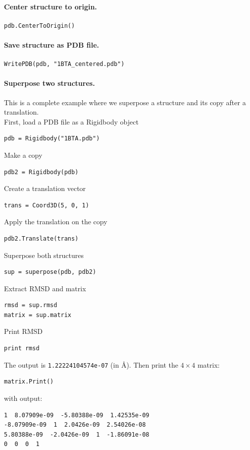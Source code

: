 \documentclass[12pt,a4paper]{article}
\begin{document}
\paragraph{Center structure to origin.}
\begin{verbatim}
pdb.CenterToOrigin()
\end{verbatim}


\paragraph{Save structure as PDB file.}
\begin{verbatim}
WritePDB(pdb, "1BTA_centered.pdb")
\end{verbatim}


\paragraph{Superpose two structures.} This is a complete example where we
superpose a structure and its copy after a translation.\\

\noindent
First, load a PDB file as a Rigidbody object
\begin{verbatim}
pdb = Rigidbody("1BTA.pdb")
\end{verbatim}
Make a copy
\begin{verbatim}
pdb2 = Rigidbody(pdb)
\end{verbatim}
Create a translation vector
\begin{verbatim}
trans = Coord3D(5, 0, 1)
\end{verbatim}
Apply the translation on the copy
\begin{verbatim}
pdb2.Translate(trans)
\end{verbatim}
Superpose both structures
\begin{verbatim}
sup = superpose(pdb, pdb2)
\end{verbatim}
Extract RMSD and matrix
\begin{verbatim}
rmsd = sup.rmsd
matrix = sup.matrix
\end{verbatim}
Print RMSD
\begin{verbatim}
print rmsd
\end{verbatim}
The output is {\tt 1.22224104574e-07} (in \AA). Then print the $4 \times 4$ matrix:
\begin{verbatim}
matrix.Print()
\end{verbatim}
with output:
\begin{verbatim}
1  8.07909e-09  -5.80388e-09  1.42535e-09  
-8.07909e-09  1  2.0426e-09  2.54026e-08  
5.80388e-09  -2.0426e-09  1  -1.86091e-08  
0  0  0  1  
\end{verbatim}
\end{document}
